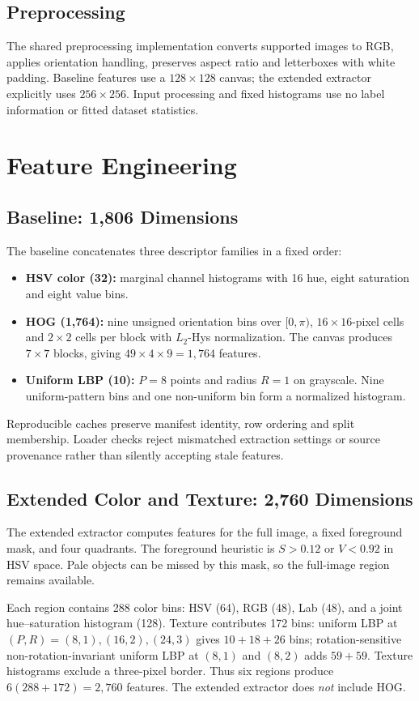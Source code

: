 \documentclass[conference]{IEEEtran}
\begin{document}
\subsection{Preprocessing}
The shared preprocessing implementation converts supported images to RGB, applies orientation handling, preserves aspect ratio and letterboxes with white padding. Baseline features use a $128\times128$ canvas; the extended extractor explicitly uses $256\times256$. Input processing and fixed histograms use no label information or fitted dataset statistics.

\section{Feature Engineering}
\subsection{Baseline: 1,806 Dimensions}
The baseline concatenates three descriptor families in a fixed order:
\begin{itemize}
\item \textbf{HSV color (32):} marginal channel histograms with 16 hue, eight saturation and eight value bins.
\item \textbf{HOG (1,764):} nine unsigned orientation bins over $[0,\pi)$, $16\times16$-pixel cells and $2\times2$ cells per block with $L_2$-Hys normalization. The canvas produces $7\times7$ blocks, giving $49\times4\times9=1,764$ features.
\item \textbf{Uniform LBP (10):} $P=8$ points and radius $R=1$ on grayscale. Nine uniform-pattern bins and one non-uniform bin form a normalized histogram.
\end{itemize}
Reproducible caches preserve manifest identity, row ordering and split membership. Loader checks reject mismatched extraction settings or source provenance rather than silently accepting stale features.

\subsection{Extended Color and Texture: 2,760 Dimensions}
The extended extractor computes features for the full image, a fixed foreground mask, and four quadrants. The foreground heuristic is $S>0.12$ or $V<0.92$ in HSV space. Pale objects can be missed by this mask, so the full-image region remains available.

Each region contains 288 color bins: HSV (64), RGB (48), Lab (48), and a joint hue--saturation histogram (128). Texture contributes 172 bins: uniform LBP at $(P,R)=(8,1),(16,2),(24,3)$ gives $10+18+26$ bins; rotation-sensitive non-rotation-invariant uniform LBP at $(8,1)$ and $(8,2)$ adds $59+59$. Texture histograms exclude a three-pixel border. Thus six regions produce $6(288+172)=2,760$ features. The extended extractor does \emph{not} include HOG.
\end{document}
